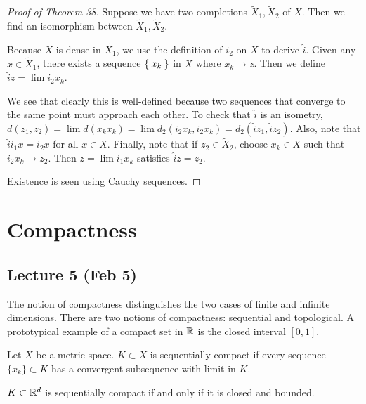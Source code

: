 \documentclass[10pt, twoside]{article}
\begin{document}
    \begin{proof}[Proof of Theorem 38]
            Suppose we have two completions $\tilde{X}_1, \tilde{X}_2$ of $X$. Then we find an isomorphism between $\tilde{X}_1, \tilde{X}_2$. 
            
            Because $X$ is dense in $\tilde{X_1}$, we use the definition of $i_2$ on $X$ to derive $\hat{i}$. Given any $x \in \tilde{X}_1$, there exists a sequence $\Set{x_k}$ in $X$ where $x_k \rightarrow z$. Then we define $\hat{i}z = \lim i_2x_k$. 
            
            We see that clearly this is well-defined because two sequences that converge to the same point must approach each other. To check that $\hat{i}$ is an isometry, $d(z_1, z_2) = \lim d(x_k \overline{x}_k) = \lim d_2(i_2x_k, i_2\overline{x}_k) = d_2(\hat{i}z_1, \hat{i}z_2)$. Also, note that $\hat{i}i_1x = i_2x$ for all $x \in X$. Finally, note that if $z_2 \in \tilde{X}_2$, choose $x_k \in X$ such that $i_2x_k \rightarrow z_2$. Then $z=\lim i_1x_k$ satisfies $\hat{i}z = z_2$.

            Existence is seen using Cauchy sequences.
    \end{proof}

    \section{Compactness}

    \subsection{Lecture 5 (Feb 5)}

    

    The notion of compactness distinguishes the two cases of finite and infinite dimensions. There are two notions of compactness: sequential and topological. A prototypical example of a compact set in $\mathbb{R}$ is the closed interval $[0,1]$.

    \begin{defn}
        Let $X$ be a metric space. $K \subset X$ is sequentially compact if every sequence $\{x_k\} \subset K$ has a convergent subsequence with limit in $K$.
    \end{defn}

    \begin{thm}
        $K \subset \mathbb{R}^d$ is sequentially compact if and only if it is closed and bounded.
    \end{thm}
\end{document}
